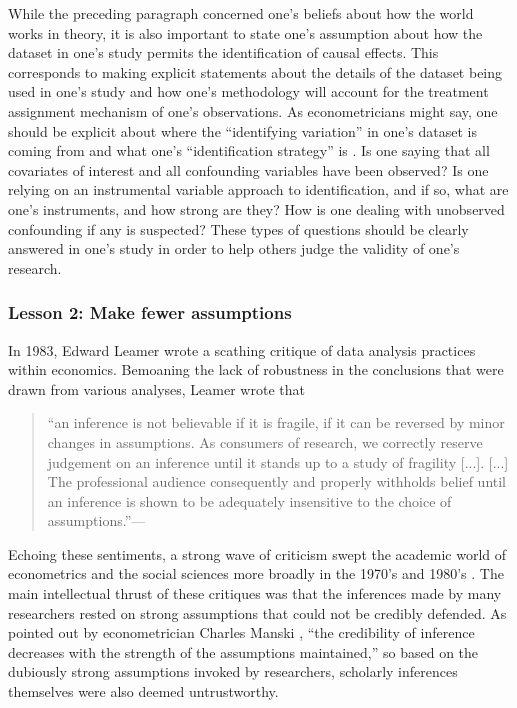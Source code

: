 While the preceding paragraph concerned one's beliefs about how the world works in theory, it is also important to state one's assumption about how the dataset in one's study permits the identification of causal effects. This corresponds to making explicit statements about the details of the dataset being used in one's study and how one's methodology will account for the treatment assignment mechanism of one's observations. As econometricians might say, one should be explicit about where the ``identifying variation'' in one's dataset is coming from and what one's ``identification strategy'' is \citep{angrist2010credibility, keele2015statistics}. Is one saying that all covariates of interest and all confounding variables have been observed? Is one relying on an instrumental variable approach to identification, and if so, what are one's instruments, and how strong are they? How is one dealing with unobserved confounding if any is suspected? These types of questions should be clearly answered in one's study in order to help others judge the validity of one's research.

\subsubsection{Lesson 2: Make fewer assumptions}
\label{sec:fewer-assumptions}
In 1983, Edward Leamer wrote a scathing critique of data analysis practices within economics. Bemoaning the lack of robustness in the conclusions that were drawn from various analyses, Leamer wrote that 
\begin{quotation}
``an inference is not believable if it is fragile, if it can be reversed by minor changes in assumptions. As consumers of research, we correctly reserve judgement on an inference until it stands up to a study of fragility [...]. [...] The professional audience consequently and properly withholds belief until an inference is shown to be adequately insensitive to the choice of assumptions.''---\citep{leamer1983let}
\end{quotation}
Echoing these sentiments, a strong wave of criticism swept the academic world of econometrics and the social sciences more broadly in the 1970's and 1980's \citep{leontief1971theoretical, freedman1985statistics, abbott1988transcending}. The main intellectual thrust of these critiques was that the inferences made by many researchers rested on strong assumptions that could not be credibly defended. As pointed out by econometrician Charles Manski \citep{manski2003partial}, ``the credibility of inference decreases with the strength of the assumptions maintained,'' so based on the dubiously strong assumptions invoked by researchers, scholarly inferences themselves were also deemed untrustworthy.

